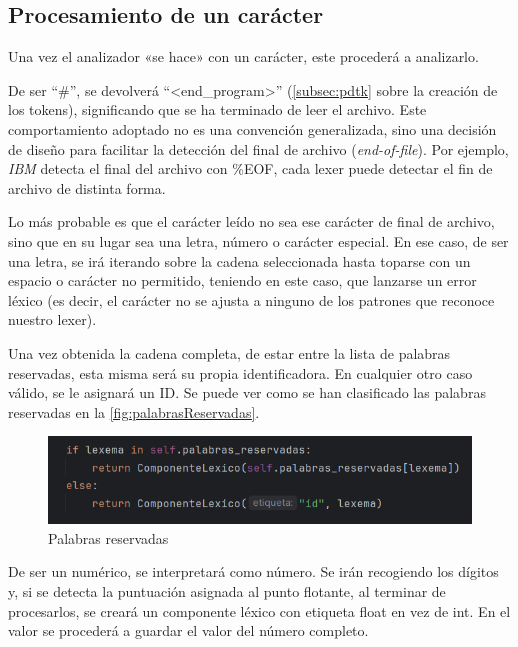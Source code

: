\documentclass[a4paper,twocolumn]{article}
\begin{document}
    \subsection{Procesamiento de un carácter}\label{subsec:procesamiento-de-un-caracter}
    Una vez el analizador «se hace» con un carácter, este procederá a analizarlo.


    De ser ``\#'', se devolverá ``<end\_program>'' (\autoref{subsec:pdtk} sobre la creación de los tokens), significando que se ha terminado de leer el archivo.
    Este comportamiento adoptado no es una convención generalizada, sino una decisión de diseño para facilitar la detección del final de archivo (\textit{end-of-file}).
    Por ejemplo, \textit{IBM} detecta el final del archivo con \%EOF\cite{IBM_EOF}, cada lexer puede detectar el fin de archivo de distinta forma.\par
    Lo más probable es que el carácter leído no sea ese carácter de final de archivo, sino que en su lugar sea una letra, número o carácter especial.
    En ese caso, de ser una letra, se irá iterando sobre la cadena seleccionada hasta toparse con un espacio o carácter no permitido, teniendo en este caso, que lanzarse un error léxico (es decir, el carácter no se ajusta a ninguno de los patrones que reconoce nuestro lexer).

    Una vez obtenida la cadena completa, de estar entre la lista de palabras reservadas, esta misma será su propia identificadora.
    En cualquier otro caso válido, se le asignará un ID.
    Se puede ver como se han clasificado las palabras reservadas en la \autoref{fig:palabrasReservadas}.

    \begin{figure}[h]
        \centering
        \includegraphics[width=1.00\linewidth]{esReservada}
        \caption{Palabras reservadas}
        \label{fig:palabrasReservadas}
    \end{figure}

    De ser un numérico, se interpretará como número.
    Se irán recogiendo los dígitos y, si se detecta la puntuación asignada al punto flotante, al terminar de procesarlos, se creará un componente léxico con etiqueta float en vez de int.
    En el valor se procederá a guardar el valor del número completo.
\end{document}
